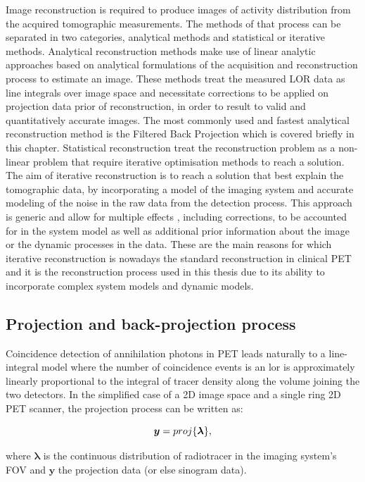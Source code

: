 Image reconstruction is required to produce images of activity distribution from the acquired tomographic measurements. The methods of that process can be separated in two categories, analytical methods and statistical or iterative methods.  
Analytical reconstruction methods make use of linear analytic approaches based on analytical formulations of the acquisition and reconstruction process to estimate an image. These methods treat the measured LOR data as line integrals over image space and necessitate corrections to be applied on projection data prior of reconstruction, in order to result to valid and quantitatively accurate images. The most commonly used and fastest analytical reconstruction method is the Filtered Back Projection which is covered briefly in this chapter. 
Statistical reconstruction treat the reconstruction problem as a non-linear problem that require iterative optimisation methods to reach a solution. The aim of iterative reconstruction is to reach a solution that best explain the tomographic data, by incorporating a model of the imaging system and accurate modeling of the noise in the raw data from the detection process. This approach is generic and allow for multiple effects , including corrections, to be accounted for in the system model as well as additional prior information about the image or the dynamic processes in the data. These are the main reasons for which iterative reconstruction is nowadays the standard reconstruction in clinical PET and it is the reconstruction process used in this thesis due to its ability to incorporate complex system models and dynamic models. 

\subsection{Projection and back-projection process}
Coincidence detection of annihilation photons in PET leads naturally to a line-integral model where the number of coincidence events is an \gls{lor} is approximately linearly proportional to the integral of tracer density along the volume joining the two detectors. 
In the simplified case of a 2D image space and a single ring 2D PET scanner, the projection process can be written as:

\begin{equation}
   \bm y = proj\{\bm{\lambda}\}  \\, 
  \label{eqn:Radon}
\end{equation}

where $\bm{\lambda}$ is the continuous distribution of radiotracer in the imaging system's FOV and $\bm{y}$ the projection data (or else sinogram data). 

